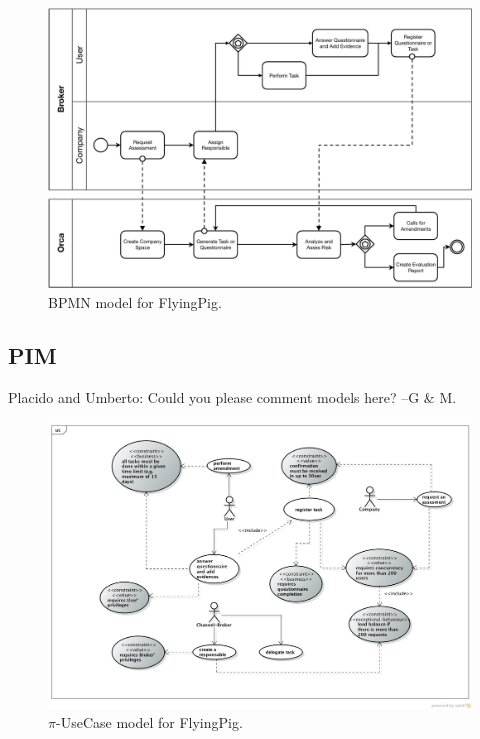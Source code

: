\begin{figure}[t]
\centering
\includegraphics[width=1.0\textwidth]{figs/BPMN_GCP.pdf}
\caption{BPMN model for FlyingPig.\label{fig:BPMNmodel}}
\label{fig:bpmn}
\end{figure}


\subsection{PIM}


{\color{magenta} Placido and Umberto: Could you please comment models here? --G \& M.}


\begin{figure}
\centering
\includegraphics[width=1.0\textwidth]{figs/UseCaseGeneral.png}
\caption{$\pi$-UseCase model for FlyingPig.\label{fig:piUseCaseModel}}
\label{fig:bpmn}
\end{figure}

